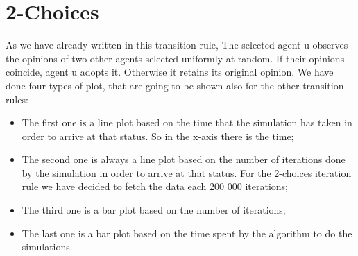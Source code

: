 \section{2-Choices}
\label{2Choices}

As we have already written in this transition rule, The selected agent u observes the opinions of two other agents selected uniformly at random. If their opinions coincide, agent u adopts it. Otherwise it retains its original opinion.
We have done four types of plot, that are going to be shown also for the other transition rules:
\begin{itemize}
     \item The first one is a line plot based on the time that the simulation has taken in order to arrive at that status. So in the x-axis there is the time;
     \item The second one is always a line plot based on the number of iterations done by the simulation in order to arrive at that status. For the 2-choices iteration rule we have decided to fetch the data each 200 000 iterations;
     \item The third one is a bar plot based on the number of iterations;
     \item The last one is a bar plot based on the time spent by the algorithm to do the simulations.
\end{itemize}



